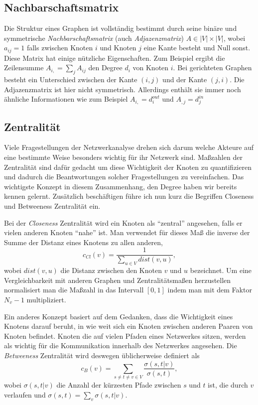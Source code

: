\documentclass[a4paper,ngerman,oneside,titlepage,bibliography=totoc,11pt]{scrreprt}
\begin{document}
\subsection{Nachbarschaftsmatrix}

Die Struktur eines Graphen ist vollständig bestimmt durch seine binäre und symmetrische\emph{ Nachbarschaftsmatrix} (auch \emph{Adjazenzmatrix}) $A \in |V| \times |V|$, wobei $a_{ij} = 1$ falls zwischen Knoten $i$ und Knoten $j$ eine Kante besteht und Null sonst. Diese Matrix hat einige nützliche Eigenschaften. Zum Beispiel ergibt die Zeilensumme $A_{i,} = \sum_j{A_{ij}}$ den Degree $d_i$ von Knoten $i$.  
Bei gerichteten Graphen besteht ein Unterschied zwischen der Kante $(i,j)$ und der Kante $(j,i)$. Die Adjazenzmatrix ist hier nicht symmetrisch. Allerdings enthält sie immer noch ähnliche Informationen wie zum Beispiel $A_{i,} = d_i^{out}$ und $A_{,j} = d_j^{in}$

\subsection{Zentralität}
Viele Fragestellungen der Netzwerkanalyse drehen sich darum welche Akteure auf eine bestimmte Weise besonders wichtig für ihr Netzwerk sind. Maßzahlen der Zentralität sind dafür gedacht um diese Wichtigkeit der Knoten zu quantifizieren und dadurch die Beantwortungen solcher Fragestellungen zu vereinfachen. Das wichtigste Konzept in diesem Zusammenhang, den Degree haben wir bereits kennen gelernt. Zusätzlich beschäftigen führe ich nun kurz die Begriffen Closeness und Betweeness Zentralität ein.

Bei der \emph{Closeness} Zentralität wird ein Knoten als "`zentral"' angesehen, falls er vielen anderen Knoten "`nahe"' ist.
Man verwendet für dieses Maß die inverse der Summe der Distanz eines Knotens zu allen anderen,
$$ c_{Cl}(v)=\frac{1}{\sum_{u \in V}{dist(v,u)}}, $$
wobei $dist(v,u)$ die Distanz zwischen den Knoten $v$ und $u$ bezeichnet. Um eine Vergleichbarkeit mit anderen Graphen und Zentralitätsmaßen herzustellen normalisiert man die Maßzahl in das Intervall $[0,1]$ indem man mit dem Faktor $N_v - 1$ multipliziert.

Ein anderes Konzept basiert auf dem Gedanken, dass die Wichtigkeit eines Knotens darauf beruht, in wie weit sich ein Knoten zwischen anderen Paaren von Knoten befindet. Knoten die auf vielen Pfaden eines Netzwerkes sitzen, werden als wichtig für die Kommunikation innerhalb des Netzwerkes angesehen. 
Die \emph{Betweeness} Zentralität wird deswegen üblicherweise definiert als
$$ c_{B}(v)= \sum_{s \neq t \neq v \in V} {\frac{\sigma(s,t|v)}{\sigma(s,t)}}, $$
wobei $\sigma(s,t|v)$ die Anzahl der kürzesten Pfade zwischen $s$ und $t$ ist, die durch $v$ verlaufen und $\sigma(s,t) = \sum_v{\sigma(s,t|v)}$.
\end{document}
